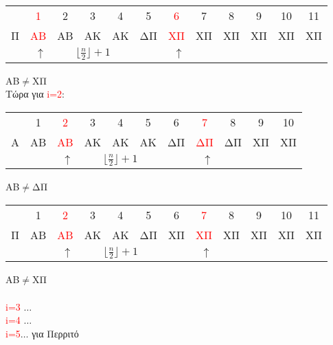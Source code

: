 \documentclass[a4paper]{article}
\begin{document}
\begin{itemize}
\begin{center}
\begin{tabular}{r|c|c|c|c|c|c|c|c|c|c|c|}
\multicolumn{1}{r}{} & \multicolumn{1}{c}{\textcolor{red}{1}} & \multicolumn{1}{c}{2} & \multicolumn{1}{c}{3} & \multicolumn{1}{c}{4} & \multicolumn{1}{c}{5} & \multicolumn{1}{c}{\textcolor{red}{6}} & \multicolumn{1}{c}{7} & \multicolumn{1}{c}{8} & \multicolumn{1}{c}{9} & \multicolumn{1}{c}{10} & \multicolumn{1}{c}{11}\\
\cline{2-12}
 Π& \textcolor{red}{ΑΒ} & ΑΒ & ΑΚ & ΑΚ & ΔΠ & \textcolor{red}{ΧΠ} & ΧΠ & ΧΠ & ΧΠ & ΧΠ & ΧΠ \\
\cline{2-12}
\multicolumn{2}{r}{$\uparrow$} & \multicolumn{3}{c}{$\lfloor\frac{n}{2}\rfloor+1$} & \multicolumn{2}{r}{$\uparrow$}\\
\cline{2-7}
\end{tabular}
\end{center}
ΑΒ$\neq$XΠ\\
Tώρα για \textcolor{red}{i=2}:
\begin{center}
\begin{tabular}{r|c|c|c|c|c|c|c|c|c|c|}
\multicolumn{1}{r}{} & \multicolumn{1}{c}{1} & \multicolumn{1}{c}{\textcolor{red}{2}} & \multicolumn{1}{c}{3} & \multicolumn{1}{c}{4} & \multicolumn{1}{c}{5} & \multicolumn{1}{c}{6} & \multicolumn{1}{c}{\textcolor{red}{7}} & \multicolumn{1}{c}{8} & \multicolumn{1}{c}{9} & \multicolumn{1}{c}{10}\\
\cline{2-11}
 Α& ΑΒ & \textcolor{red}{ΑΒ} & ΑΚ & ΑΚ & ΑΚ & ΔΠ & \textcolor{red}{ΔΠ} & ΔΠ & ΧΠ & ΧΠ\\
\cline{2-11}
\multicolumn{3}{r}{$\uparrow$} & \multicolumn{3}{c}{$\lfloor\frac{n}{2}\rfloor+1$} & \multicolumn{2}{r}{$\uparrow$}\\
\cline{3-8}




     
\end{tabular}
\end{center}
ΑΒ$\neq$ΔΠ
\begin{center}
    
\begin{tabular}{r|c|c|c|c|c|c|c|c|c|c|c|}
\multicolumn{1}{r}{} & \multicolumn{1}{c}{1} & \multicolumn{1}{c}{\textcolor{red}{2}} & \multicolumn{1}{c}{3} & \multicolumn{1}{c}{4} & \multicolumn{1}{c}{5} & \multicolumn{1}{c}{6} & \multicolumn{1}{c}{\textcolor{red}{7}} & \multicolumn{1}{c}{8} & \multicolumn{1}{c}{9} & \multicolumn{1}{c}{10} & \multicolumn{1}{c}{11}\\
\cline{2-12}
 Π& ΑΒ & \textcolor{red}{ΑΒ} & ΑΚ & ΑΚ & ΔΠ & ΧΠ & \textcolor{red}{ΧΠ} & ΧΠ & ΧΠ & ΧΠ & ΧΠ \\
\cline{2-12}
\multicolumn{3}{r}{$\uparrow$} & \multicolumn{3}{c}{$\lfloor\frac{n}{2}\rfloor+1$} & \multicolumn{2}{r}{$\uparrow$}\\
\cline{3-8}
\end{tabular}
\end{center}
ΑΒ$\neq$XΠ\\
\\\textcolor{red}{i=3}
$\dots$\\\textcolor{red}{i=4}
$\dots$\\\textcolor{red}{i=5}$\dots$ για Περριτό


\end{itemize}
\end{document}
